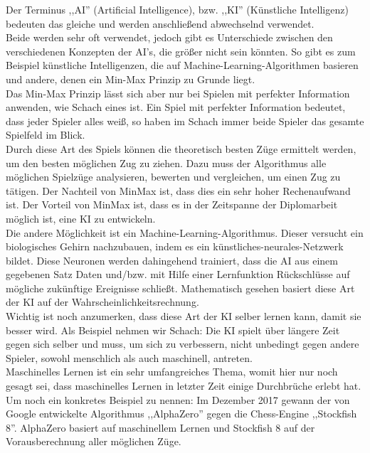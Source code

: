 \documentclass[12pt,a4paper]{article}
\begin{document}
{Der Terminus ,,AI'' (Artificial Intelligence), bzw. ,,KI'' (Künstliche Intelligenz) bedeuten das gleiche und werden anschließend abwechselnd verwendet. \\
Beide werden sehr oft verwendet, jedoch gibt es Unterschiede zwischen den verschiedenen Konzepten der AI's, die größer nicht sein könnten. So gibt es zum Beispiel künstliche Intelligenzen, die auf Machine-Learning-Algorithmen basieren und andere, denen ein Min-Max Prinzip zu Grunde liegt. \\
Das Min-Max Prinzip lässt sich aber nur bei Spielen mit perfekter Information anwenden, wie Schach eines ist. Ein Spiel mit perfekter Information bedeutet, dass jeder Spieler alles weiß, so haben im Schach immer beide Spieler das gesamte Spielfeld im Blick. \\[2ex]
Durch diese Art des Spiels können die theoretisch besten Züge ermittelt werden, um den besten möglichen Zug zu ziehen. Dazu muss der Algorithmus alle möglichen Spielzüge analysieren, bewerten und vergleichen, um einen Zug zu tätigen. Der Nachteil von MinMax ist, dass dies ein sehr hoher Rechenaufwand ist. Der Vorteil von MinMax ist, dass es in der Zeitspanne der Diplomarbeit möglich ist, eine KI zu entwickeln.\\[2ex]
Die andere Möglichkeit ist ein Machine-Learning-Algorithmus. Dieser versucht ein biologisches Gehirn nachzubauen, indem es ein künstliches-neurales-Netzwerk bildet. Diese Neuronen werden dahingehend trainiert, dass die AI aus einem gegebenen Satz Daten und/bzw. mit Hilfe einer Lernfunktion Rückschlüsse auf mögliche zukünftige Ereignisse schließt. Mathematisch gesehen basiert diese Art der KI auf der Wahrscheinlichkeitsrechnung.  \\
Wichtig ist noch anzumerken, dass diese Art der KI selber lernen kann, damit sie besser wird. Als Beispiel nehmen wir Schach: Die KI spielt über längere Zeit gegen sich selber und muss, um sich zu verbessern, nicht unbedingt gegen andere Spieler, sowohl menschlich als auch maschinell, antreten. \\
Maschinelles Lernen ist ein sehr umfangreiches Thema, womit hier nur noch gesagt sei, dass maschinelles Lernen in letzter Zeit einige Durchbrüche erlebt hat. Um noch ein konkretes Beispiel zu nennen: Im Dezember 2017 gewann der von Google entwickelte Algorithmus ,,AlphaZero'' gegen die Chess-Engine ,,Stockfish 8''. AlphaZero basiert auf maschinellem Lernen und Stockfish 8 auf der Vorausberechnung aller möglichen Züge.\cite{SkyNet} \\[2ex]


}
\end{document}
